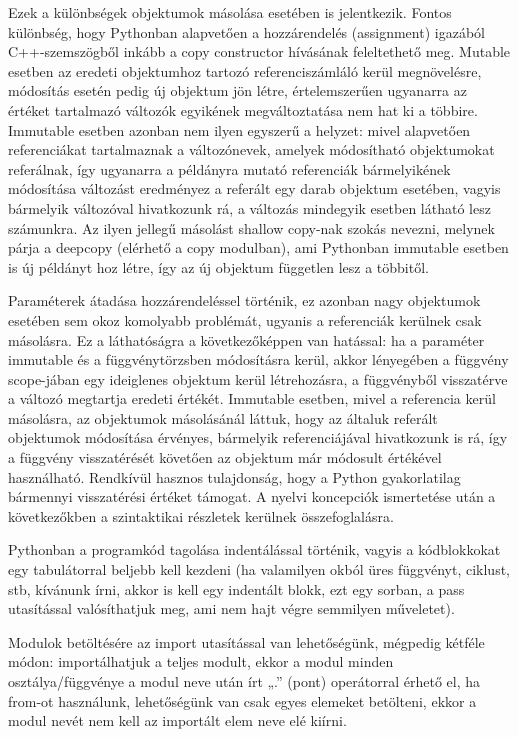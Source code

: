 \documentclass[12pt,a4paper,oneside]{report}             %
\begin{document}
Ezek a különbségek objektumok másolása esetében is jelentkezik. Fontos különbség, hogy Pythonban alapvetően a hozzárendelés (assignment) igazából C++-szemszögből inkább a copy constructor hívásának feleltethető meg. Mutable esetben az eredeti objektumhoz tartozó referenciszámláló kerül megnövelésre, módosítás esetén pedig új objektum jön létre, értelemszerűen ugyanarra az értéket tartalmazó változók egyikének megváltoztatása nem hat ki a többire. Immutable esetben azonban nem ilyen egyszerű a helyzet: mivel alapvetően referenciákat tartalmaznak a változónevek, amelyek módosítható objektumokat referálnak, így ugyanarra a példányra mutató referenciák bármelyikének módosítása változást eredményez a referált egy darab objektum esetében, vagyis bármelyik változóval hivatkozunk rá, a változás mindegyik esetben látható lesz számunkra. Az ilyen jellegű másolást shallow copy-nak szokás nevezni, melynek párja a deepcopy (elérhető a copy modulban), ami Pythonban immutable esetben is új példányt hoz létre, így az új objektum független lesz a többitől.

Paraméterek átadása hozzárendeléssel történik, ez azonban nagy objektumok esetében sem okoz komolyabb problémát, ugyanis a referenciák kerülnek csak másolásra. Ez a láthatóságra a következőképpen van hatással: ha a paraméter immutable és a függvénytörzsben módosításra kerül, akkor lényegében a függvény scope-jában egy ideiglenes objektum kerül létrehozásra, a függvényből visszatérve a változó megtartja eredeti értékét. Immutable esetben, mivel a referencia kerül másolásra, az objektumok másolásánál láttuk, hogy az általuk referált objektumok módosítása érvényes, bármelyik referenciájával hivatkozunk is rá, így a függvény visszatérését követően az objektum már módosult értékével használható.
Rendkívül hasznos tulajdonság, hogy a Python gyakorlatilag bármennyi visszatérési értéket támogat.
A nyelvi koncepciók ismertetése után a következőkben a szintaktikai részletek kerülnek összefoglalásra.

Pythonban a programkód tagolása indentálással történik, vagyis a kódblokkokat egy tabulátorral beljebb kell kezdeni (ha valamilyen okból üres függvényt, ciklust, stb, kívánunk írni, akkor is kell egy indentált blokk, ezt egy sorban, a pass utasítással valósíthatjuk meg, ami nem hajt végre semmilyen műveletet).

Modulok betöltésére az import utasítással van lehetőségünk, mégpedig kétféle módon: importálhatjuk a teljes modult, ekkor a modul minden osztálya/függvénye a modul neve után írt „.” (pont) operátorral érhető el, ha from-ot használunk, lehetőségünk van csak egyes elemeket betölteni, ekkor a modul nevét nem kell az importált elem neve elé kiírni.
\end{document}
